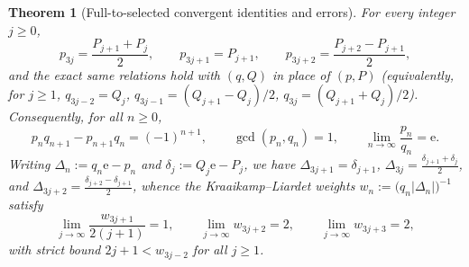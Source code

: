 \documentclass[11pt]{article}
\newtheorem{theorem}{Theorem}[section]
\theoremstyle{definition}
\theoremstyle{remark}
\newcommand{\ee}{\mathrm{e}}
\begin{document}
\begin{theorem}[Full-to-selected convergent identities and errors]\label{thm:full-identities}
For every integer $j\ge0$,
\begin{equation}\label{eq:full-conv-rel}
p_{3j}=\frac{P_{j+1}+P_j}{2},\qquad p_{3j+1}=P_{j+1},\qquad p_{3j+2}=\frac{P_{j+2}-P_{j+1}}{2},
\end{equation}
and the exact same relations hold with $(q,Q)$ in place of $(p,P)$ (equivalently,
for $j\ge1$, $q_{3j-2}=Q_j$, $q_{3j-1}=(Q_{j+1}-Q_j)/2$, $q_{3j}=(Q_{j+1}+Q_j)/2$).
Consequently, for all $n\ge0$,
\[
p_n q_{n+1}-p_{n+1}q_n=(-1)^{n+1},\qquad \gcd(p_n,q_n)=1,\qquad \lim_{n\to\infty}\frac{p_n}{q_n}=\ee.
\]
Writing $\Delta_n:=q_n\ee-p_n$ and $\delta_j:=Q_j\ee-P_j$, we have
$\Delta_{3j+1}=\delta_{j+1}$, $\Delta_{3j}=\frac{\delta_{j+1}+\delta_j}{2}$, and
$\Delta_{3j+2}=\frac{\delta_{j+2}-\delta_{j+1}}{2}$, whence the Kraaikamp--Liardet
weights $w_n:=\bigl(q_n|\Delta_n|\bigr)^{-1}$ satisfy
\begin{equation}\label{eq:kl-weights}
\lim_{j\to\infty}\frac{w_{3j+1}}{2(j+1)}=1,\qquad
\lim_{j\to\infty}w_{3j+2}=2,\qquad
\lim_{j\to\infty}w_{3j+3}=2,
\end{equation}
with strict bound $2j+1<w_{3j-2}$ for all $j\ge1$.
\end{theorem}
\end{document}
